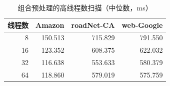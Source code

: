 \begin{table}[htbp]
\centering
\small
\caption{组合预处理的高线程数扫描（中位数，ms）}\label{tab:threads}
\begin{tabular}{rrrr}
\toprule
线程数 & Amazon & roadNet-CA & web-Google \\
\midrule
8 & 150.513 & 715.829 & 791.550 \\
16 & 123.352 & 608.375 & 622.032 \\
32 & 116.638 & 553.633 & 580.379 \\
64 & 118.860 & 579.019 & 575.759 \\
\bottomrule
\end{tabular}
\par{}
\end{table}
